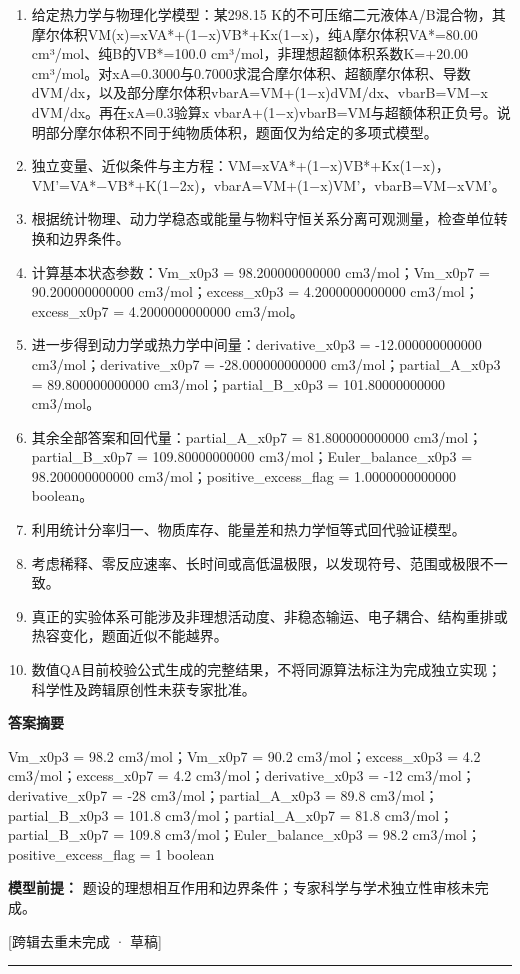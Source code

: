 \documentclass[UTF8,11pt,a4paper]{ctexart}
\begin{document}
\begin{enumerate}
\item 给定热力学与物理化学模型：某298.15 K的不可压缩二元液体A/B混合物，其摩尔体积VM(x)=xVA*+(1−x)VB*+Kx(1−x)，纯A摩尔体积VA*=80.00 cm³/mol、纯B的VB*=100.0 cm³/mol，非理想超额体积系数K=+20.00 cm³/mol。对xA=0.3000与0.7000求混合摩尔体积、超额摩尔体积、导数dVM/dx，以及部分摩尔体积vbarA=VM+(1−x)dVM/dx、vbarB=VM−x dVM/dx。再在xA=0.3验算x vbarA+(1−x)vbarB=VM与超额体积正负号。说明部分摩尔体积不同于纯物质体积，题面仅为给定的多项式模型。
\item 独立变量、近似条件与主方程：VM=xVA*+(1−x)VB*+Kx(1−x)，VM'=VA*−VB*+K(1−2x)，vbarA=VM+(1−x)VM'，vbarB=VM−xVM'。
\item 根据统计物理、动力学稳态或能量与物料守恒关系分离可观测量，检查单位转换和边界条件。
\item 计算基本状态参数：Vm\_x0p3 = 98.200000000000 cm3/mol；Vm\_x0p7 = 90.200000000000 cm3/mol；excess\_x0p3 = 4.2000000000000 cm3/mol；excess\_x0p7 = 4.2000000000000 cm3/mol。
\item 进一步得到动力学或热力学中间量：derivative\_x0p3 = -12.000000000000 cm3/mol；derivative\_x0p7 = -28.000000000000 cm3/mol；partial\_A\_x0p3 = 89.800000000000 cm3/mol；partial\_B\_x0p3 = 101.80000000000 cm3/mol。
\item 其余全部答案和回代量：partial\_A\_x0p7 = 81.800000000000 cm3/mol；partial\_B\_x0p7 = 109.80000000000 cm3/mol；Euler\_balance\_x0p3 = 98.200000000000 cm3/mol；positive\_excess\_flag = 1.0000000000000 boolean。
\item 利用统计分率归一、物质库存、能量差和热力学恒等式回代验证模型。
\item 考虑稀释、零反应速率、长时间或高低温极限，以发现符号、范围或极限不一致。
\item 真正的实验体系可能涉及非理想活动度、非稳态输运、电子耦合、结构重排或热容变化，题面近似不能越界。
\item 数值QA目前校验公式生成的完整结果，不将同源算法标注为完成独立实现；科学性及跨辑原创性未获专家批准。
\end{enumerate}
\noindent\textbf{答案摘要}\par
Vm\_x0p3 = 98.2 cm3/mol；Vm\_x0p7 = 90.2 cm3/mol；excess\_x0p3 = 4.2 cm3/mol；excess\_x0p7 = 4.2 cm3/mol；derivative\_x0p3 = -12 cm3/mol；derivative\_x0p7 = -28 cm3/mol；partial\_A\_x0p3 = 89.8 cm3/mol；partial\_B\_x0p3 = 101.8 cm3/mol；partial\_A\_x0p7 = 81.8 cm3/mol；partial\_B\_x0p7 = 109.8 cm3/mol；Euler\_balance\_x0p3 = 98.2 cm3/mol；positive\_excess\_flag = 1 boolean\par
\noindent\textbf{模型前提：}
题设的理想相互作用和边界条件；专家科学与学术独立性审核未完成。\par
\noindent\textcolor{red!65!black}{[跨辑去重未完成 · 草稿]} \par
\medskip\hrule\medskip
{}
\end{document}
